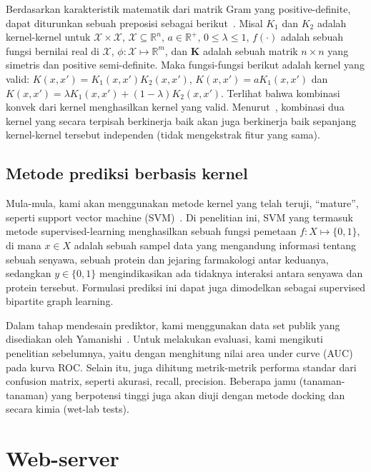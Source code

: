 Berdasarkan karakteristik matematik dari matrik Gram yang positive-definite, dapat diturunkan sebuah preposisi sebagai berikut~\cite{Cristianini:1999}.
Misal $K_1$ dan $K_2$ adalah kernel-kernel untuk $\mathcal{X} \times \mathcal{X}$, $\mathcal{X} \subseteq \mathbb{R}^n$, $a \in \mathbb{R}^+$, $0 \le \lambda \le 1$, $f(\cdot)$ adalah sebuah fungsi bernilai real di $\mathcal{X}$, $\phi: \boldsymbol{\mathcal{X}} \mapsto \mathbb{R}^m$, dan $\boldsymbol{K}$ adalah sebuah matrik $n \times n$ yang simetris dan positive semi-definite.
Maka fungsi-fungsi berikut adalah kernel yang valid:
$K(x,x') = K_1(x,x') K_2(x,x')$, $K(x,x') = aK_1(x,x')$ dan 
$K(x,x') = \lambda K_1(x,x') + (1-\lambda)K_2(x,x')$.
Terlihat bahwa kombinasi konvek dari kernel menghasilkan kernel yang valid. 
Menurut~\cite{Joachims01compositekernels}, kombinasi dua kernel yang secara terpisah berkinerja baik akan juga berkinerja baik sepanjang kernel-kernel tersebut independen (tidak mengekstrak fitur yang sama).

\subsection{Metode prediksi berbasis kernel} 
Mula-mula, kami akan menggunakan metode kernel yang telah teruji, ``mature'', seperti support vector machine (SVM)~\cite{Scholkopf:2001}.
Di penelitian ini, SVM yang termasuk metode supervised-learning menghasilkan sebuah fungsi pemetaan $f: X \mapsto \{0,1\}$, 
di mana $x \in X$ adalah sebuah sampel data yang mengandung informasi tentang sebuah senyawa, sebuah protein dan jejaring farmakologi antar keduanya, 
sedangkan $y \in \{0,1\}$ mengindikasikan ada tidaknya interaksi antara senyawa dan protein tersebut.
Formulasi prediksi ini dapat juga dimodelkan sebagai supervised bipartite graph learning.

Dalam tahap mendesain prediktor, kami menggunakan data set publik yang disediakan oleh Yamanishi~\cite{BleakleyY09}.
Untuk melakukan evaluasi, kami mengikuti penelitian sebelumnya, yaitu dengan menghitung nilai area under curve (AUC) pada kurva ROC.
Selain itu, juga dihitung metrik-metrik performa standar dari confusion matrix, seperti akurasi, recall, precision.
Beberapa jamu (tanaman-tanaman) yang berpotensi tinggi juga akan diuji dengan metode docking dan secara kimia (wet-lab tests).

\section{Web-server}
